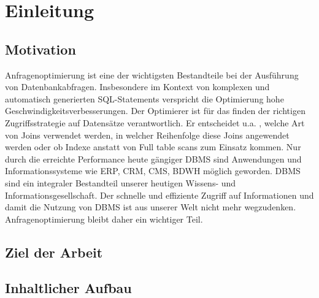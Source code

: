 \chapter{Einleitung}

\section{Motivation}
Anfragenoptimierung ist eine der wichtigsten Bestandteile bei der Ausführung von Datenbankabfragen. Insbesondere im Kontext von komplexen und automatisch generierten SQL-Statements verspricht die Optimierung hohe Geschwindigkeitsverbesserungen. Der Optimierer ist für das finden der richtigen Zugriffsstrategie auf Datensätze verantwortlich. Er entscheidet u.a. , welche Art von Joins verwendet werden, in welcher Reihenfolge diese Joins angewendet werden oder ob Indexe anstatt von Full table scans zum Einsatz kommen. Nur durch die erreichte Performance heute gängiger \ac{DBMS} sind Anwendungen und Informationssysteme wie \ac{ERP}, \ac{CRM}, \ac{CMS}, \ac{BDWH} möglich geworden. \ac{DBMS} sind ein integraler Bestandteil unserer heutigen Wissens- und Informationsgesellschaft. Der schnelle und effiziente Zugriff auf Informationen und damit die Nutzung von \ac{DBMS} ist aus unserer Welt nicht mehr wegzudenken. Anfragenoptimierung bleibt daher ein wichtiger Teil.




\section{Ziel der Arbeit}

\section{Inhaltlicher Aufbau}
